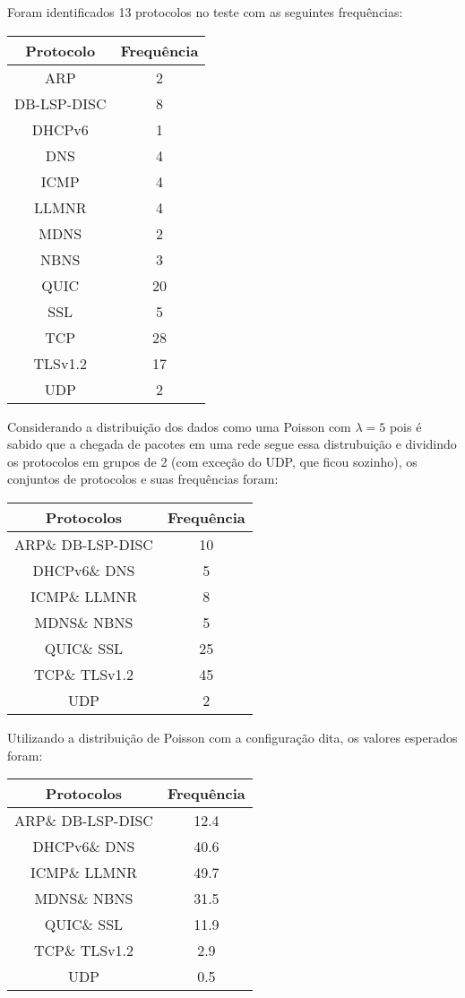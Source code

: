 \documentclass[11pt,a4paper]{book}
\begin{document}
\begin{enumerate}
\begin{itemize}
					Foram identificados 13 protocolos no teste com as seguintes frequências:
					\begin{tabular}{|c|c|}
						\hline
						Protocolo & Frequência\\
						\hline
						ARP & 2\\
						\hline
						DB-LSP-DISC & 8\\
						\hline
						DHCPv6 & 1\\
						\hline
						DNS & 4\\
						\hline
						ICMP & 4\\
						\hline
						LLMNR & 4\\
						\hline
						MDNS & 2\\
						\hline
						NBNS & 3\\
						\hline
						QUIC & 20\\
						\hline
						SSL & 5\\
						\hline
						TCP & 28\\
						\hline
						TLSv1.2 &  17\\
						\hline
						UDP & 2\\
						\hline
					\end{tabular}
					Considerando a distribuição dos dados como uma Poisson com $\lambda=5$ pois é sabido que a chegada de pacotes em uma rede segue essa distrubuição e dividindo os protocolos em grupos de 2 (com exceção do UDP, que ficou sozinho), os conjuntos de protocolos e suas frequências foram:
					\begin{tabular}{|c|c|}
						\hline
						Protocolos & Frequência\\
						\hline
						ARP\& DB-LSP-DISC & 10\\
						\hline
						DHCPv6\& DNS & 5\\
						\hline
						ICMP\& LLMNR & 8\\
						\hline
						MDNS\& NBNS & 5\\
						\hline
						QUIC\& SSL & 25\\
						\hline
						TCP\& TLSv1.2 & 45\\
						\hline
						UDP & 2\\
						\hline
					\end{tabular}
					Utilizando a distribuição de Poisson com a configuração dita, os valores esperados foram:
					
					\begin{tabular}{|c|c|}
						\hline
						Protocolos & Frequência\\
						\hline
						ARP\& DB-LSP-DISC & 12.4\\
						\hline
						DHCPv6\& DNS & 40.6\\
						\hline
						ICMP\& LLMNR & 49.7\\
						\hline
						MDNS\& NBNS & 31.5\\
						\hline
						QUIC\& SSL & 11.9\\
						\hline
						TCP\& TLSv1.2 & 2.9\\
						\hline
						UDP & 0.5\\
						\hline
					\end{tabular}
										

\end{itemize}
\end{enumerate}
\end{document}

